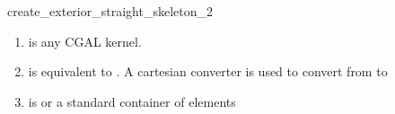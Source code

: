 \begin{ccRefFunction}{create_exterior_straight_skeleton_2}

\begin{enumerate}  
   \item    {} is any CGAL kernel.
   \item    {} is equivalent to .
            A cartesian converter is used to convert from  to 
   \item    {} is  or a standard container of  elements 
\end{enumerate}


\ccSeeAlso
{}\\
 \\

\end{ccRefFunction}


